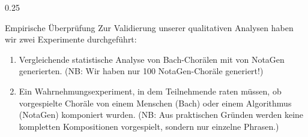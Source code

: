 \documentclass[final]{beamer}
\begin{document}
\begin{frame}[t]
\begin{columns}[t]
    \begin{column}{0.25\textwidth}
      \begin{block}{Empirische Überprüfung}
        Zur Validierung unserer qualitativen Analysen haben wir zwei Experimente durchgeführt:
        \begin{enumerate}
          \item Vergleichende \alert{statistische Analyse} von Bach-Chorälen mit von NotaGen generierten.
        (NB: Wir haben nur 100 NotaGen-Choräle generiert!)
      \item Ein \alert{Wahrnehmungsexperiment}, in dem Teilnehmende raten müssen, ob vorgespielte Choräle 
            von einem Menschen (Bach) oder einem Algorithmus (NotaGen) komponiert wurden. (NB: Aus praktischen 
            Gründen werden keine kompletten Kompositionen vorgespielt, sondern nur einzelne Phrasen.)
        \end{enumerate}

\end{block}
\end{column}
\end{columns}
\end{frame}
\end{document}
